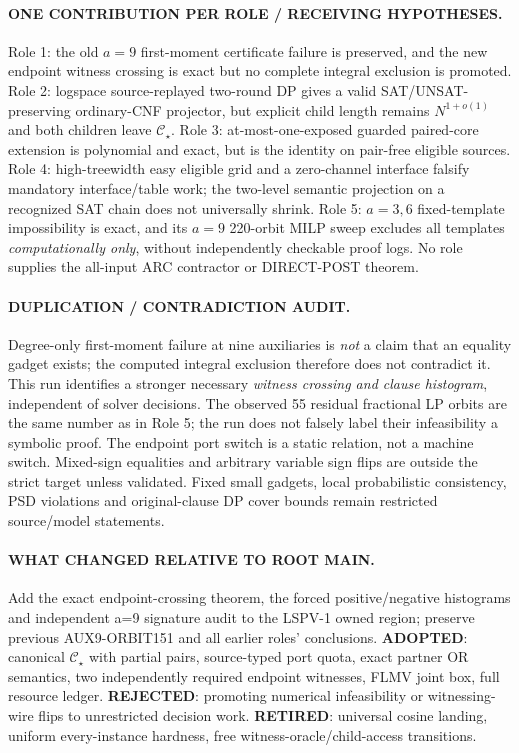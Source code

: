 \documentclass[11pt]{article}
\newcommand{\CS}{\mathcal C_\star}
\begin{document}
\paragraph{ONE CONTRIBUTION PER ROLE / RECEIVING HYPOTHESES.}
Role 1: the old $a=9$ first-moment certificate failure is preserved, and the new endpoint witness crossing is exact but no complete integral exclusion is promoted. Role 2: logspace source-replayed two-round DP gives a valid SAT/UNSAT-preserving ordinary-CNF projector, but explicit child length remains $N^{1+o(1)}$ and both children leave $\CS$. Role 3: at-most-one-exposed guarded paired-core extension is polynomial and exact, but is the identity on pair-free eligible sources. Role 4: high-treewidth easy eligible grid and a zero-channel interface falsify mandatory interface/table work; the two-level semantic projection on a recognized SAT chain does not universally shrink. Role 5: $a=3,6$ fixed-template impossibility is exact, and its $a=9$ 220-orbit MILP sweep excludes all templates \emph{computationally only}, without independently checkable proof logs. No role supplies the all-input ARC contractor or DIRECT-POST theorem.

\paragraph{DUPLICATION / CONTRADICTION AUDIT.}
Degree-only first-moment failure at nine auxiliaries is \emph{not} a claim that an equality gadget exists; the computed integral exclusion therefore does not contradict it. This run identifies a stronger necessary \emph{witness crossing and clause histogram}, independent of solver decisions. The observed 55 residual fractional LP orbits are the same number as in Role 5; the run does not falsely label their infeasibility a symbolic proof. The endpoint port switch is a static relation, not a machine switch. Mixed-sign equalities and arbitrary variable sign flips are outside the strict target unless validated. Fixed small gadgets, local probabilistic consistency, PSD violations and original-clause DP cover bounds remain restricted source/model statements.

\paragraph{WHAT CHANGED RELATIVE TO ROOT MAIN.}
Add the exact endpoint-crossing theorem, the forced positive/negative histograms and independent a=9 signature audit to the LSPV-1 owned region; preserve previous AUX9-ORBIT151 and all earlier roles' conclusions. \textbf{ADOPTED}: canonical $\CS$ with partial pairs, source-typed port quota, exact partner OR semantics, two independently required endpoint witnesses, FLMV joint box, full resource ledger. \textbf{REJECTED}: promoting numerical infeasibility or witnessing-wire flips to unrestricted decision work. \textbf{RETIRED}: universal cosine landing, uniform every-instance hardness, free witness-oracle/child-access transitions.
\end{document}
